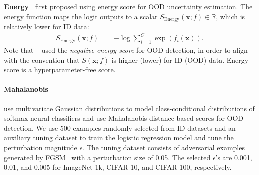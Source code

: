 \documentclass{article}
\def\*#1{\mathbf{#1}}
\begin{document}

\textbf{Energy~\cite{liu2020energy}} \citeauthor{liu2020energy} first proposed using energy score for OOD uncertainty estimation. The energy function  maps the logit outputs to a scalar $S_\mathrm{Energy}(\*x; f) \in \mathbb{R}$, which is relatively lower for ID data:
\begin{align}
\label{eq:energy}
S_\mathrm{Energy}(\*x; f)& =-\log \sum_{i=1}^{C}\exp(f_i(\*x)).
\end{align}
Note that \citeauthor{liu2020energy}~\cite{liu2020energy} used the \emph{negative energy score} for OOD detection, in order to align with the convention that $S(\*x;f)$ is higher (lower) for ID (OOD) data. Energy score is a hyperparameter-free score. 

\paragraph{Mahalanobis~\cite{lee2018simple}} \citeauthor{lee2018simple} use multivariate Gaussian distributions to model class-conditional distributions of softmax neural classifiers and use Mahalanobis distance-based scores for OOD detection. We use 500 examples randomly selected from ID datasets and an auxiliary tuning dataset to train the logistic regression model and tune the perturbation magnitude $\epsilon$. The tuning dataset consists of adversarial examples generated by FGSM~\cite{goodfellow2014explaining} with a perturbation size of 0.05.\@
The selected $\epsilon$'s are 0.001, 0.01, and 0.005 for ImageNet-1k, CIFAR-10, and CIFAR-100, respectively.
\end{document}
